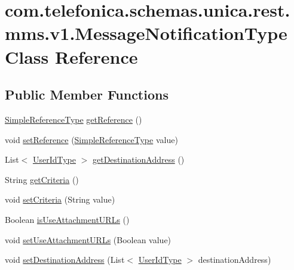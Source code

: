 \hypertarget{classcom_1_1telefonica_1_1schemas_1_1unica_1_1rest_1_1mms_1_1v1_1_1MessageNotificationType}{
\section{com.telefonica.schemas.unica.rest.mms.v1.MessageNotificationType Class Reference}
\label{classcom_1_1telefonica_1_1schemas_1_1unica_1_1rest_1_1mms_1_1v1_1_1MessageNotificationType}
}
\subsection*{Public Member Functions}
\begin{DoxyCompactItemize}
\item 
\hyperlink{classcom_1_1telefonica_1_1schemas_1_1unica_1_1rest_1_1common_1_1v1_1_1SimpleReferenceType}{SimpleReferenceType} \hyperlink{classcom_1_1telefonica_1_1schemas_1_1unica_1_1rest_1_1mms_1_1v1_1_1MessageNotificationType_ac0cd7ee1e5606ccc5b6c71c261715d10}{getReference} ()
\item 
void \hyperlink{classcom_1_1telefonica_1_1schemas_1_1unica_1_1rest_1_1mms_1_1v1_1_1MessageNotificationType_a9ec49433c7fd75e8c34742c7646729df}{setReference} (\hyperlink{classcom_1_1telefonica_1_1schemas_1_1unica_1_1rest_1_1common_1_1v1_1_1SimpleReferenceType}{SimpleReferenceType} value)
\item 
List$<$ \hyperlink{classcom_1_1telefonica_1_1schemas_1_1unica_1_1rest_1_1common_1_1v1_1_1UserIdType}{UserIdType} $>$ \hyperlink{classcom_1_1telefonica_1_1schemas_1_1unica_1_1rest_1_1mms_1_1v1_1_1MessageNotificationType_a4f10fdca0d122d548a68b03eb224e8b2}{getDestinationAddress} ()
\item 
String \hyperlink{classcom_1_1telefonica_1_1schemas_1_1unica_1_1rest_1_1mms_1_1v1_1_1MessageNotificationType_a78e69d195ead17a2c5b8896f98ad6bca}{getCriteria} ()
\item 
void \hyperlink{classcom_1_1telefonica_1_1schemas_1_1unica_1_1rest_1_1mms_1_1v1_1_1MessageNotificationType_ab933a7024e90ff648cf52425bb102305}{setCriteria} (String value)
\item 
Boolean \hyperlink{classcom_1_1telefonica_1_1schemas_1_1unica_1_1rest_1_1mms_1_1v1_1_1MessageNotificationType_a3019e41baa188497bdbcb09ea64f9863}{isUseAttachmentURLs} ()
\item 
void \hyperlink{classcom_1_1telefonica_1_1schemas_1_1unica_1_1rest_1_1mms_1_1v1_1_1MessageNotificationType_acfe0d31cd6db70c6d5b1897489503c1e}{setUseAttachmentURLs} (Boolean value)
\item 
void \hyperlink{classcom_1_1telefonica_1_1schemas_1_1unica_1_1rest_1_1mms_1_1v1_1_1MessageNotificationType_a38d5fac61a56c63917f63d59a602ddaf}{setDestinationAddress} (List$<$ \hyperlink{classcom_1_1telefonica_1_1schemas_1_1unica_1_1rest_1_1common_1_1v1_1_1UserIdType}{UserIdType} $>$ destinationAddress)
\end{DoxyCompactItemize}
